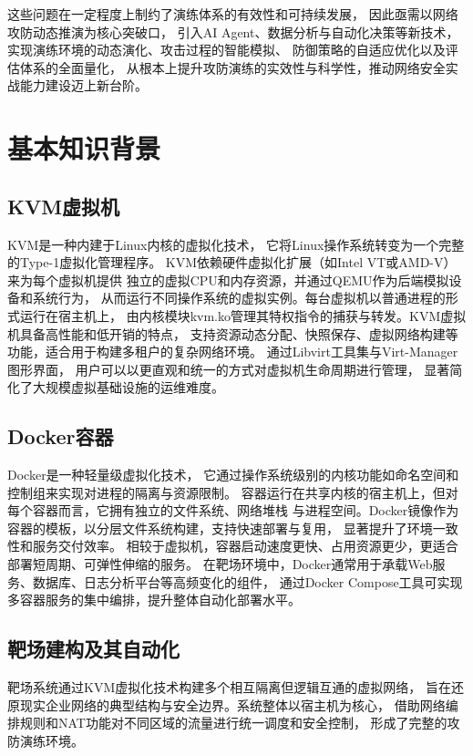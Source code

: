 \documentclass[lang=cn,10pt]{elegantbook}
\begin{document}
这些问题在一定程度上制约了演练体系的有效性和可持续发展，
因此亟需以网络攻防动态推演为核心突破口，
引入AI Agent、数据分析与自动化决策等新技术，
实现演练环境的动态演化、攻击过程的智能模拟、
防御策略的自适应优化以及评估体系的全面量化，
从根本上提升攻防演练的实效性与科学性，推动网络安全实战能力建设迈上新台阶。

\section{基本知识背景}

\subsection{KVM虚拟机}

KVM是一种内建于Linux内核的虚拟化技术，
它将Linux操作系统转变为一个完整的Type-1虚拟化管理程序。
KVM依赖硬件虚拟化扩展（如Intel VT或AMD-V）来为每个虚拟机提供
独立的虚拟CPU和内存资源，并通过QEMU作为后端模拟设备和系统行为，
从而运行不同操作系统的虚拟实例。每台虚拟机以普通进程的形式运行在宿主机上，
由内核模块kvm.ko管理其特权指令的捕获与转发。KVM虚拟机具备高性能和低开销的特点，
支持资源动态分配、快照保存、虚拟网络构建等功能，适合用于构建多租户的复杂网络环境。
通过Libvirt工具集与Virt-Manager图形界面，
用户可以以更直观和统一的方式对虚拟机生命周期进行管理，
显著简化了大规模虚拟基础设施的运维难度。

\subsection{Docker容器}

Docker是一种轻量级虚拟化技术，
它通过操作系统级别的内核功能如命名空间和控制组来实现对进程的隔离与资源限制。
容器运行在共享内核的宿主机上，但对每个容器而言，它拥有独立的文件系统、网络堆栈
与进程空间。Docker镜像作为容器的模板，以分层文件系统构建，支持快速部署与复用，
显著提升了环境一致性和服务交付效率。
相较于虚拟机，容器启动速度更快、占用资源更少，更适合部署短周期、可弹性伸缩的服务。
在靶场环境中，Docker通常用于承载Web服务、数据库、日志分析平台等高频变化的组件，
通过Docker Compose工具可实现多容器服务的集中编排，提升整体自动化部署水平。

\subsection{靶场建构及其自动化}

靶场系统通过KVM虚拟化技术构建多个相互隔离但逻辑互通的虚拟网络，
旨在还原现实企业网络的典型结构与安全边界。系统整体以宿主机为核心，
借助网络编排规则和NAT功能对不同区域的流量进行统一调度和安全控制，
形成了完整的攻防演练环境。
\end{document}
